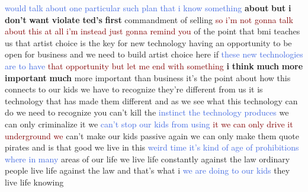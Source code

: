 \textcolor{RoyalBlue}{would} \textcolor{RoyalBlue}{talk} \textcolor{RoyalBlue}{about} \textcolor{RoyalBlue}{one} \textcolor{RoyalBlue}{particular} \textcolor{RoyalBlue}{such} \textcolor{RoyalBlue}{plan} \textcolor{RoyalBlue}{that} \textcolor{RoyalBlue}{i} \textcolor{RoyalBlue}{know} \textcolor{RoyalBlue}{something} \textbf{about} \textbf{but} \textbf{i} \textbf{don't} \textbf{want} \textbf{violate} \textbf{ted's} \textbf{first} commandment of selling \textcolor{Maroon}{so} \textcolor{Maroon}{i'm} \textcolor{Maroon}{not} \textcolor{Maroon}{gonna} \textcolor{Maroon}{talk} \textcolor{Maroon}{about} \textcolor{Maroon}{this} \textcolor{Maroon}{at} \textcolor{Maroon}{all} \textcolor{Maroon}{i'm} \textcolor{Maroon}{instead} \textcolor{Maroon}{just} \textcolor{Maroon}{gonna} \textcolor{Maroon}{remind} \textcolor{Maroon}{you} of the point that bmi teaches us that artist choice is the key for new technology having an opportunity to be open for business and we need to build artist choice here if \textcolor{RoyalBlue}{these} \textcolor{RoyalBlue}{new} \textcolor{RoyalBlue}{technologies} \textcolor{RoyalBlue}{are} \textcolor{RoyalBlue}{to} \textcolor{RoyalBlue}{have} \textcolor{Maroon}{that} \textcolor{Maroon}{opportunity} \textcolor{Maroon}{but} \textcolor{Maroon}{let} \textcolor{Maroon}{me} \textcolor{Maroon}{end} \textcolor{Maroon}{with} \textcolor{Maroon}{something} \textbf{i} \textbf{think} \textbf{much} \textbf{more} \textbf{important} \textbf{much} more important than business it's the point about how this connects to our kids we have to recognize they're different from us it is technology that has made them different and as we see what this technology can do we need to recognize you can't kill the \textcolor{RoyalBlue}{instinct} \textcolor{RoyalBlue}{the} \textcolor{RoyalBlue}{technology} \textcolor{RoyalBlue}{produces} we can only criminalize it we \textcolor{RoyalBlue}{can't} \textcolor{RoyalBlue}{stop} \textcolor{RoyalBlue}{our} \textcolor{RoyalBlue}{kids} \textcolor{RoyalBlue}{from} \textcolor{RoyalBlue}{using} \textcolor{Maroon}{it} \textcolor{Maroon}{we} \textcolor{Maroon}{can} \textcolor{Maroon}{only} \textcolor{Maroon}{drive} \textcolor{Maroon}{it} \textcolor{Maroon}{underground} \textcolor{Maroon}{we} can't make our kids passive again we can only make them quote pirates and is that good we live in this \textcolor{RoyalBlue}{weird} \textcolor{RoyalBlue}{time} \textcolor{RoyalBlue}{it's} \textcolor{RoyalBlue}{kind} \textcolor{RoyalBlue}{of} \textcolor{RoyalBlue}{age} \textcolor{RoyalBlue}{of} \textcolor{RoyalBlue}{prohibitions} \textcolor{RoyalBlue}{where} \textcolor{RoyalBlue}{in} \textcolor{RoyalBlue}{many} areas of our life we live life constantly against the law ordinary people live life against the law and that's what i \textcolor{RoyalBlue}{we} \textcolor{RoyalBlue}{are} \textcolor{RoyalBlue}{doing} \textcolor{RoyalBlue}{to} \textcolor{RoyalBlue}{our} \textcolor{RoyalBlue}{kids} they live life knowing